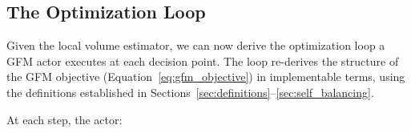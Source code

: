 
\subsection{The Optimization Loop}
\label{subsec:optimization_loop}

Given the local volume estimator, we can now derive the optimization loop a GFM
actor executes at each decision point. The loop re-derives the structure of the
GFM objective (Equation~\eqref{eq:gfm_objective}) in implementable terms, using
the definitions established in
Sections~\ref{sec:definitions}--\ref{sec:self_balancing}.

At each step, the actor:

